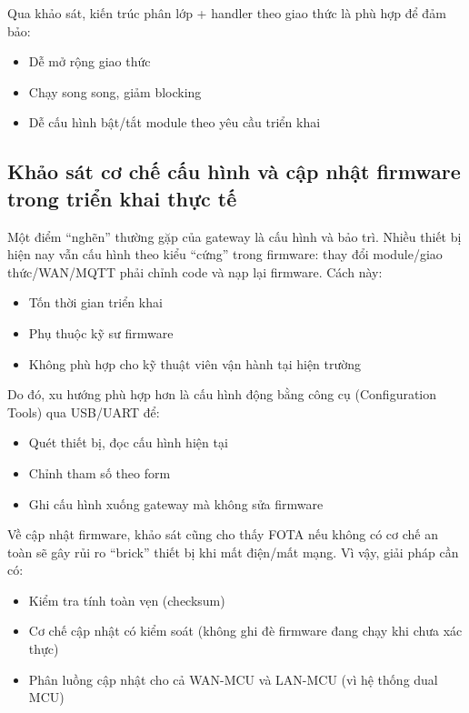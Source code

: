         Qua khảo sát, kiến trúc phân lớp + handler theo giao thức là phù hợp để đảm bảo:
        \begin{itemize}
            \item Dễ mở rộng giao thức
            \item Chạy song song, giảm blocking
            \item Dễ cấu hình bật/tắt module theo yêu cầu triển khai
        \end{itemize}

    \subsection{Khảo sát cơ chế cấu hình và cập nhật firmware trong triển khai thực tế}
        Một điểm “nghẽn” thường gặp của gateway là cấu hình và bảo trì. Nhiều thiết bị hiện nay vẫn cấu hình theo kiểu “cứng” trong firmware: thay đổi module/giao thức/WAN/MQTT phải chỉnh code và nạp lại firmware. Cách này:
        \begin{itemize}
            \item Tốn thời gian triển khai
            \item Phụ thuộc kỹ sư firmware
            \item Không phù hợp cho kỹ thuật viên vận hành tại hiện trường
        \end{itemize}

        Do đó, xu hướng phù hợp hơn là cấu hình động bằng công cụ (Configuration Tools) qua USB/UART để:
        \begin{itemize}
            \item Quét thiết bị, đọc cấu hình hiện tại
            \item Chỉnh tham số theo form
            \item Ghi cấu hình xuống gateway mà không sửa firmware
        \end{itemize}

        Về cập nhật firmware, khảo sát cũng cho thấy FOTA nếu không có cơ chế an toàn sẽ gây rủi ro “brick” thiết bị khi mất điện/mất mạng. Vì vậy, giải pháp cần có:
        \begin{itemize}
            \item Kiểm tra tính toàn vẹn (checksum)
            \item Cơ chế cập nhật có kiểm soát (không ghi đè firmware đang chạy khi chưa xác thực)
            \item Phân luồng cập nhật cho cả WAN-MCU và LAN-MCU (vì hệ thống dual MCU)
        \end{itemize}
